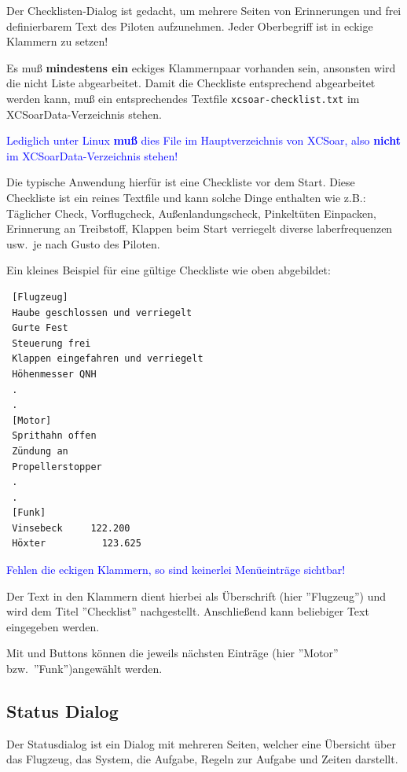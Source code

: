 Der Checklisten-Dialog ist gedacht, um mehrere Seiten von Erinnerungen und frei definierbarem Text des Piloten aufzunehmen. Jeder Oberbegriff ist in eckige Klammern zu setzen! 


\achtung Es  muß \textbf{mindestens ein} eckiges Klammernpaar vorhanden sein, ansonsten wird die nicht Liste abgearbeitet.
Damit die Checkliste entsprechend abgearbeitet werden kann, muß ein entsprechendes Textfile \verb|xcsoar-checklist.txt|  
im \textsf{XCSoarData}-Verzeichnis stehen.

\warning \textcolor{blue}{Lediglich unter Linux \textbf{muß} dies File im Hauptverzeichnis von \textsf{XCSoar}, also \textbf{nicht} im  \textsf{XCSoarData}-Verzeichnis stehen!}

Die typische Anwendung hierfür ist eine Checkliste vor dem Start. Diese Checkliste ist ein reines Textfile und kann solche Dinge enthalten wie z.B.:
Täglicher Check, Vorflugcheck, Außenlandungscheck, Pinkeltüten Einpacken, Erinnerung an Treibstoff, Klappen beim Start verriegelt diverse laberfrequenzen usw.\ je nach Gusto des Piloten.  

Ein kleines Beispiel für eine gültige Checkliste wie oben abgebildet: 
\begin{small}
\begin{verbatim}
 [Flugzeug]
 Haube geschlossen und verriegelt
 Gurte Fest
 Steuerung frei
 Klappen eingefahren und verriegelt
 Höhenmesser QNH
 .
 .
 [Motor]
 Sprithahn offen
 Zündung an
 Propellerstopper 
 .
 .
 [Funk]
 Vinsebeck     122.200
 Höxter          123.625
\end{verbatim}
\end{small}

\achtung \textcolor{blue}{Fehlen die eckigen Klammern, so sind keinerlei Menüeinträge sichtbar!}


Der Text in den Klammern dient hierbei als Überschrift (hier ''Flugzeug'') und wird dem Titel ''Checklist'' nachgestellt. 
Anschließend kann beliebiger Text eingegeben werden. 


Mit  \button{$<$} und \button{$>$} Buttons  können die jeweils nächsten Einträge (hier ''Motor'' bzw.\ ''Funk'')angewählt werden.

\subsection*{Status Dialog}

Der Statusdialog ist ein Dialog mit mehreren Seiten, welcher eine Übersicht über das Flugzeug, das System, die Aufgabe, Regeln zur Aufgabe und Zeiten darstellt. 

